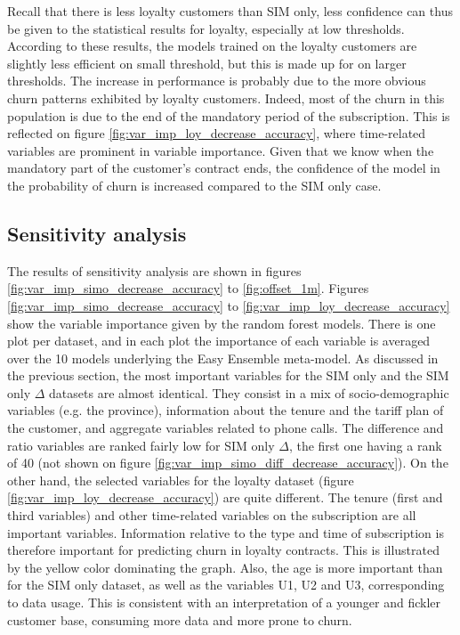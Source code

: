Recall that there is less loyalty customers than SIM only, less confidence can
thus be given to the statistical results for loyalty, especially at low
thresholds. According to these results, the models trained on the loyalty
customers are slightly less efficient on small threshold, but this is made up
for on larger thresholds. The increase in performance is probably due to the
more obvious churn patterns exhibited by loyalty customers. Indeed, most of the
churn in this population is due to the end of the mandatory period of the
subscription. This is reflected on figure
\ref{fig:var_imp_loy_decrease_accuracy}, where time-related variables are
prominent in variable importance. Given that we know when the mandatory part of
the customer's contract ends, the confidence of the model in the probability of
churn is increased compared to the SIM only case.

\subsection{Sensitivity analysis}

The results of sensitivity analysis are shown in figures
\ref{fig:var_imp_simo_decrease_accuracy} to \ref{fig:offset_1m}. Figures
\ref{fig:var_imp_simo_decrease_accuracy} to
\ref{fig:var_imp_loy_decrease_accuracy} show the variable importance given by
the random forest models. There is one plot per dataset, and in each plot the
importance of each variable is averaged over the 10 models underlying the Easy
Ensemble meta-model. As discussed in the previous section, the most important
variables for the SIM only and the SIM only $\Delta$ datasets are almost
identical. They consist in a mix of socio-demographic variables (e.g. the
province), information about the tenure and the tariff plan of the customer, and
aggregate variables related to phone calls. The difference and ratio variables
are ranked fairly low for SIM only $\Delta$, the first one having a rank of 40
(not shown on figure \ref{fig:var_imp_simo_diff_decrease_accuracy}). On the
other hand, the selected variables for the loyalty dataset (figure
\ref{fig:var_imp_loy_decrease_accuracy}) are quite different. The tenure (first
and third variables) and other time-related variables on the subscription are
all important variables. Information relative to the type and time of
subscription is therefore important for predicting churn in loyalty contracts.
This is illustrated by the yellow color dominating the graph. Also, the age is
more important than for the SIM only dataset, as well as the variables U1, U2
and U3, corresponding to data usage. This is consistent with an interpretation
of a younger and fickler customer base, consuming more data and more prone to
churn.


